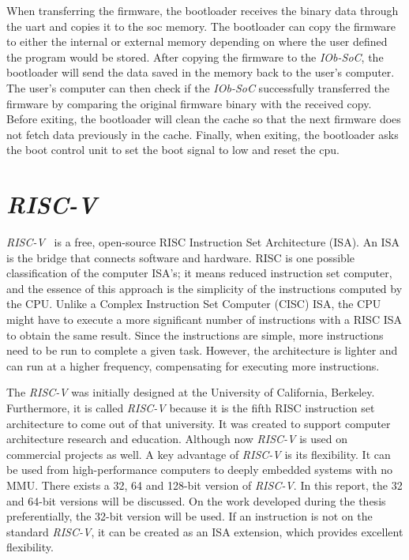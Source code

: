 When transferring the firmware, the bootloader receives the binary data through the \acrshort{uart} and copies it to the \acrshort{soc} memory. The bootloader can copy the firmware to either the internal or external memory depending on where the user defined the program would be stored. After copying the firmware to the \textit{IOb-SoC}, the bootloader will send the data saved in the memory back to the user's computer. The user's computer can then check if the \textit{IOb-SoC} successfully transferred the firmware by comparing the original firmware binary with the received copy. Before exiting, the bootloader will clean the cache so that the next firmware does not fetch data previously in the cache. Finally, when exiting, the bootloader asks the boot control unit to set the boot signal to low and reset the \acrshort{cpu}.

\section{\textit{RISC-V}}
\label{section:riscv}
\textit{RISC-V}~\cite{asanovic2014instruction} is a free, open-source RISC Instruction Set Architecture (ISA). An ISA is the bridge that connects software and hardware. RISC is one possible classification of the computer ISA's; it means reduced instruction set computer, and the essence of this approach is the simplicity of the instructions computed by the CPU. Unlike a Complex Instruction Set Computer (CISC) ISA, the CPU might have to execute a more significant number of instructions with a RISC ISA to obtain the same result. Since the instructions are simple, more instructions need to be run to complete a given task. However, the architecture is lighter and can run at a higher frequency, compensating for executing more instructions.

The \textit{RISC-V} was initially designed at the University of California, Berkeley. Furthermore, it is called \textit{RISC-V} because it is the fifth RISC instruction set architecture to come out of that university. It was created to support computer architecture research and education. Although now \textit{RISC-V} is used on commercial projects as well. A key advantage of \textit{RISC-V} is its flexibility. It can be used from high-performance computers to deeply embedded systems with no MMU. There exists a 32, 64 and 128-bit version of \textit{RISC-V}. In this report, the 32 and 64-bit versions will be discussed. On the work developed during the thesis preferentially, the 32-bit version will be used. If an instruction is not on the standard \textit{RISC-V}, it can be created as an ISA extension, which provides excellent flexibility.

